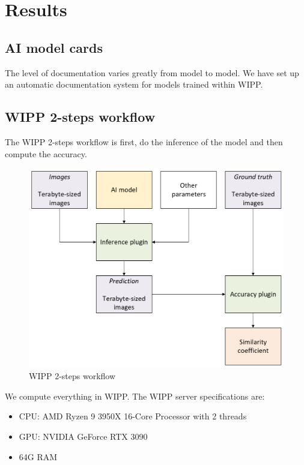 \section{Results}
\label{sec:results}

\subsection{AI model cards}

The level of documentation varies greatly from model to model. We have set up an
automatic documentation system for models trained within \Gls{WIPP}.

\subsection{WIPP 2-steps workflow}

The WIPP 2-steps workflow is first, do the inference of the model and then
compute the accuracy.

\begin{figure}[H]
  \centering
  \includegraphics[width=1.0\linewidth]{png/results/workflow.png}
  \caption{WIPP 2-steps workflow}
  \label{fig:workflow}
\end{figure}

We compute everything in \Gls{WIPP}. The \Gls{WIPP} server specifications are:
\begin{itemize}
  \item CPU: AMD Ryzen 9 3950X 16-Core Processor with 2 threads
  \item GPU: NVIDIA GeForce RTX 3090
  \item 64G RAM
\end{itemize}

